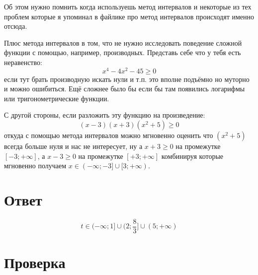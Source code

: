 \documentclass{article}
\begin{document}
Об этом нужно помнить когда используешь метод интервалов и некоторые из тех проблем которые я упоминал в файлике про метод интервалов происходят именно отсюда.

Плюс метода интервалов в том, что не нужно исследовать поведение сложной функции с помощью, например, производных. Представь себе что у тебя есть неравенство:
$$x^4-4x^2-45\ge{}0$$
если тут брать производную искать нули и т.п. это вполне подъёмно но муторно и можно ошибиться. Ещё сложнее было бы если бы там появились логарифмы или тригонометрические функции.

С другой стороны, если разложить эту функцию на произведение:
$$(x-3)(x+3)(x^2+5)\ge{}0$$
откуда с помощью метода интервалов можно мгновенно оценить что $(x^2+5)$ всегда больше нуля и нас не интересует, ну а $x+3\ge{}0$ на промежутке $[-3;+\infty]$, а $x-3\ge{}0$ на промежутке $[+3;+\infty]$ комбинируя которые мгновенно получаем $x\in{}(-\infty;-3]\cup{}[3;+\infty)$.

\section{Ответ}
$$t\in{}(-\infty;1]\cup{}(2;\frac{8}{3}]\cup{}(5;+\infty)$$

\section{Проверка}
\end{document}
